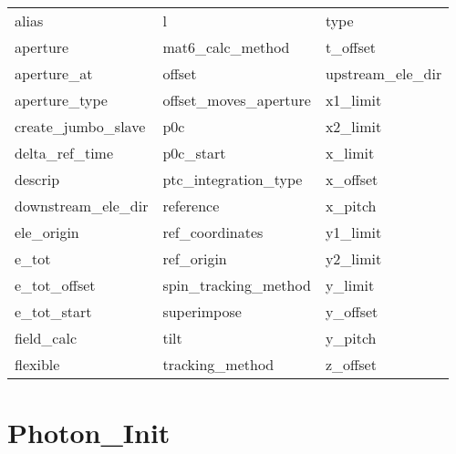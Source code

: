 \begin{tabular}{lll} \toprule
alias                       & l                           & type                        \\
aperture                    & mat6_calc_method            & t_offset                    \\
aperture_at                 & offset                      & upstream_ele_dir            \\
aperture_type               & offset_moves_aperture       & x1_limit                    \\
create_jumbo_slave          & p0c                         & x2_limit                    \\
delta_ref_time              & p0c_start                   & x_limit                     \\
descrip                     & ptc_integration_type        & x_offset                    \\
downstream_ele_dir          & reference                   & x_pitch                     \\
ele_origin                  & ref_coordinates             & y1_limit                    \\
e_tot                       & ref_origin                  & y2_limit                    \\
e_tot_offset                & spin_tracking_method        & y_limit                     \\
e_tot_start                 & superimpose                 & y_offset                    \\
field_calc                  & tilt                        & y_pitch                     \\
flexible                    & tracking_method             & z_offset                    \\
 \bottomrule
 \end{tabular}
 \vfill
 
 \section{Photon_Init}
 \label{s:list.photon.init}
 
